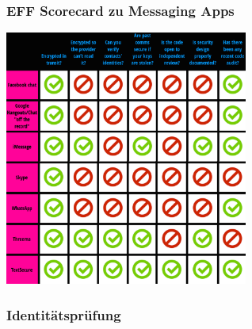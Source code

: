 \begin{frame}
  \frametitle{EFF Scorecard zu Messaging Apps}
  \center
  \includegraphics[width=0.6\textwidth]{figures/eff_scorecard.png}
\end{frame}

\begin{frame}
  \frametitle{Identitätsprüfung}
\end{frame}

